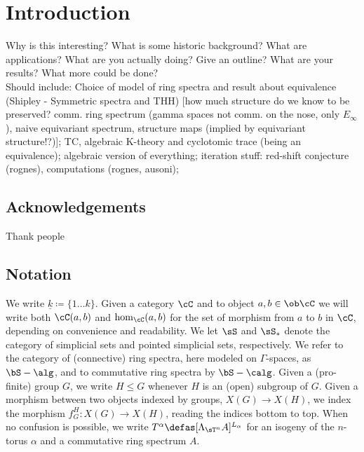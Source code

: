 \section{Introduction}
  Why is this interesting? What is some historic background? What are applications? What are you actually doing? Give an outline? What are your results? What more could be done?\\
  Should include: Choice of model of ring spectra and result about equivalence (Shipley - Symmetric spectra and THH) [how much structure do we know to be preserved? comm. ring spectrum (gamma spaces not comm. on the nose, only $E_\infty$), naive equivariant spectrum, structure maps (implied by equivariant structure!?)]; TC, algebraic K-theory and cyclotomic trace (being an equivalence); algebraic version of everything; iteration stuff: red-shift conjecture (rognes), computations (rognes, ausoni);
  \subsection{Acknowledgements}
    Thank people %
  \subsection{Notation}
    We write $\underline{k} \coloneqq \{1 \ldots k \}$.
    Given a category $\cC$ and to object $a,b \in \ob \cC$ we will write both $\cC(a,b)$ and $\hom_{\cC}(a,b)$ for the set of morphism from $a$ to $b$ in $\cC$, depending on convenience and readability.
    We let $\sS$ and $\sS_*$ denote the category of simplicial sets and pointed simplicial sets, respectively.
    We refer to the category of (connective) ring spectra, here modeled on $\Gamma$-spaces, as $\bS-\alg$, and to commutative ring spectra by $\bS-\calg$.
    Given a (pro-finite) group $G$, we write $H \leq G$ whenever $H$ is an (open) subgroup of $G$.
    Given a morphism between two objects indexed by groups, $X(G) \to X(H)$, we index the morphism $f_G^H: X(G) \to X(H)$, reading the indices bottom to top.
    When no confusion is possible, we write $T^\alpha \defas [\Lambda_{\sT^n} A]^{L_\alpha}$ for an isogeny of the $n$-torus $\alpha$ and a commutative ring spectrum $A$.
    
